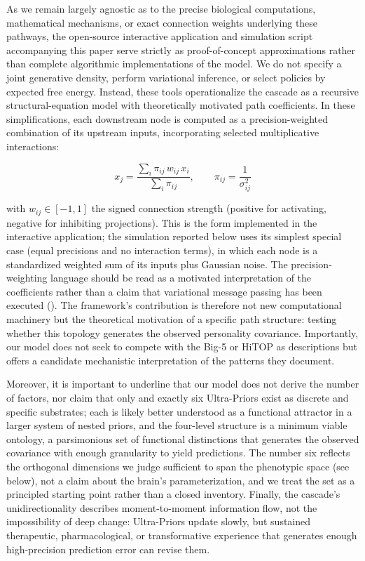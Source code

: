 \documentclass[
  jou,
  floatsintext,
  longtable,
  nolmodern,
  notxfonts,
  notimes,
  12pt,
  colorlinks=true,linkcolor=blue,citecolor=blue,urlcolor=blue]{apa7}
\begin{document}
As we remain largely agnostic as to the precise biological computations,
mathematical mechanisms, or exact connection weights underlying these
pathways, the open-source interactive application and simulation script
accompanying this paper serve strictly as proof-of-concept
approximations rather than complete algorithmic implementations of the
model. We do not specify a joint generative density, perform variational
inference, or select policies by expected free energy. Instead, these
tools operationalize the cascade as a recursive structural-equation
model with theoretically motivated path coefficients. In these
simplifications, each downstream node is computed as a
precision-weighted combination of its upstream inputs, incorporating
selected multiplicative interactions:

\[
x_j = \frac{\sum_i \pi_{ij}\, w_{ij}\, x_i}{\sum_i \pi_{ij}}, \qquad \pi_{ij} = \frac{1}{\sigma_{ij}^{2}}
\]

with \(w_{ij}\in[-1,1]\) the signed connection strength (positive for
activating, negative for inhibiting projections). This is the form
implemented in the interactive application; the simulation reported
below uses its simplest special case (equal precisions and no
interaction terms), in which each node is a standardized weighted sum of
its inputs plus Gaussian noise. The precision-weighting language should
be read as a motivated interpretation of the coefficients rather than a
claim that variational message passing has been executed
(). The
framework's contribution is therefore not new computational machinery
but the theoretical motivation of a specific path structure: testing
whether this topology generates the observed personality covariance.
Importantly, our model does not seek to compete with the Big-5 or HiTOP
as descriptions but offers a candidate mechanistic interpretation of the
patterns they document.

Moreover, it is important to underline that our model does not derive
the number of factors, nor claim that only and exactly six Ultra-Priors
exist as discrete and specific substrates; each is likely better
understood as a functional attractor in a larger system of nested
priors, and the four-level structure is a minimum viable ontology, a
parsimonious set of functional distinctions that generates the observed
covariance with enough granularity to yield predictions. The number six
reflects the orthogonal dimensions we judge sufficient to span the
phenotypic space (see below), not a claim about the brain's
parameterization, and we treat the set as a principled starting point
rather than a closed inventory. Finally, the cascade's unidirectionality
describes moment-to-moment information flow, not the impossibility of
deep change: Ultra-Priors update slowly, but sustained therapeutic,
pharmacological, or transformative experience that generates enough
high-precision prediction error can revise them.
\end{document}
